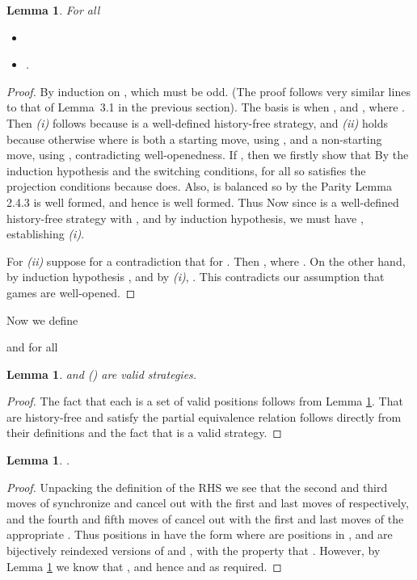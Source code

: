 \documentclass[11pt]{article}
\newtheorem{lemma}[theorem]{Lemma}
\begin{document}
\begin{lemma}\label{lem1}
For all 
\begin{itemize}
\item[(i)] 
\item[(ii)] .
\end{itemize}
\end{lemma}
\begin{proof} By induction on , which must be odd. (The proof follows very similar
lines to that of Lemma~3.1 in the previous section). The basis is
when , and , where . Then
\textit{(i)} follows because  is a well-defined history-free
strategy,
and \textit{(ii)} holds because otherwise  where  is
both
a starting move, using , and a non-starting
move, using , contradicting
well-openedness.
If , then we firstly show that  By the induction
hypothesis and the switching conditions, for all   so
 satisfies the projection conditions because  does. Also,  is balanced so by the Parity
Lemma 2.4.3  is well formed, and hence  is
well formed. Thus  Now since  is a well-defined
history-free strategy with , and 
by induction hypothesis, we must have ,
establishing {\it (i)}.

For {\it (ii)} suppose for a contradiction that  for . Then , where
. On the other hand, by induction hypothesis
, and by {\it
(i)}, . This contradicts our
assumption that games are well-opened.
\end{proof}


Now we define

and for all 

\begin{lemma}\label{lem2}
 and
 () are valid
strategies.
\end{lemma}
\begin{proof} The fact that each  is a set of valid
positions follows from Lemma \ref{lem1}. That  are
history-free and satisfy the partial equivalence relation follows
directly from their definitions and the fact that  is a
valid strategy.
\end{proof}

\begin{lemma}\label{lem3}
.
\end{lemma}
\begin{proof} Unpacking the definition of the RHS  we see that the second and third moves of 
synchronize and cancel out with the first and last moves of
 respectively, and the fourth and fifth moves of 
cancel out with the first and last moves of the appropriate
. Thus positions in  have the form  where 
are positions in , and  are bijectively reindexed
versions of  and , with the property that . However, by Lemma \ref{lem1} we know
that , and hence  and 
as required.
\end{proof}
\end{document}

